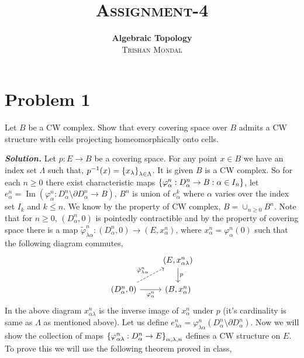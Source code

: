 \documentclass[11pt]{article}
\newcommand{\p}{\partial}
\newcommand{\sol}{ \textbf{\textit{Solution.}} }
\begin{document}
 
 \title{{\Huge \textsc{Assignment-4}}}
 \author{\textbf{ \textsf{Algebraic Topology}} \\[0.2cm]
 \large \textsc{Trishan Mondal}}
 \date{}
 \maketitle

 \section{Problem 1}

 \begin{prob}{}{}
    Let $B$ be a CW complex. Show that every covering space over $B$ admits a CW structure with cells projecting homeomorphically onto cells.
 \end{prob}
 \sol Let $p:E \to B$ be a covering space. For any point $x \in B$ we have an index set $\Lambda$ such that, $p^{-1}(x) = \qty{x_{\lambda}}_{\lambda \in \Lambda}$. It is given $B$ is a CW complex. So for each $n \geq 0$ there exist characteristic maps $\qty{\varphi_{\alpha}^n : D^n_{\alpha}\to B : \alpha \in I_n}$, let $e_\alpha^n = \operatorname{Im}(\varphi_{\alpha}^n : D_{\alpha}^n \setminus \p D_{\alpha}^n\to B)$, $B^n$ is union of $e^k_{\alpha}$ where $\alpha$ varies over the index set $I_k$ and $k \leq n$. We know by the property of CW complex, $B= \cup_{n\geq 0} B^n$. Note that for $n\geq 0$, $(D^n_{\alpha},0)$ is pointedly contractible and by the property of covering space there is a map $\tilde{\varphi}_{\lambda\alpha}^n : (D^n_{\alpha},0) \to (E,x_{\alpha}^n)$, where $x_{\alpha}^n = \varphi_{\alpha}^n(0)$ such that the following diagram commutes,
 \[\begin{tikzcd}
	& {(E,x^n_{\alpha \lambda})} \\
	{(D_{\alpha}^n,0)} & {(B,x_{\alpha}^n)}
	\arrow["p",from=1-2, to=2-2]
	\arrow["{\varphi_{\alpha}^n}"', from=2-1, to=2-2]
	\arrow["{\tilde{\varphi}_{\lambda\alpha}^n}", dashed, from=2-1, to=1-2]
\end{tikzcd}\]
In the above diagram $x^n_{\alpha \lambda}$ is the inverse image of $x_{\alpha}^n$ under $p$ (it's cardinality is same as $\Lambda$ as mentioned above). Let us define $e_{\lambda \alpha}^n = \varphi_{\lambda\alpha}^n(D_{\alpha}^n \setminus \p D_{\alpha}^n)$. Now we will show the collection of maps $\qty{\varphi_{\alpha \lambda}^n:D^n_{\alpha}\to E}_{\alpha,\lambda,n}$ defines a CW structure on $E$. To prove this we will use the following theorem proved in class,
\end{document}

